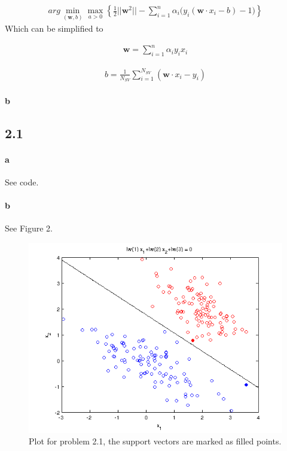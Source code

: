 \documentclass{article}
\begin{document}
\begin{align}
  arg \min_{(\mathbf{w}, b)} \max_{a > 0} \left\{ \frac{1}{2} \lvert \rvert \mathbf{w}^2 \lvert \rvert -
      \sum_{i = 1}^{n}\alpha_i \big( y_i \left( \mathbf{w} \cdot x_i - b \right) - 1 \big) \right\}
\end{align}
Which can be simplified to

\begin{align}
  \mathbf{w} = \sum_{i = 1}^{n}\alpha_i y_i x_i
\end{align}


\begin{align}
  b = \frac{1}{N_{SV}} \sum_{i = 1}^{N_{SV}} \left( \mathbf{w} \cdot x_i - y_i \right)
\end{align}

\paragraph{b}

\subsection*{2.1}
\paragraph{a}
See code.

\paragraph{b}
See Figure 2.
\begin{figure}
\begin{center}
\includegraphics[scale = 0.6]{pics/plot21.png}
\caption{Plot for problem 2.1, the support vectors are marked as filled points.}
\end{center}
\end{figure}
\end{document}

